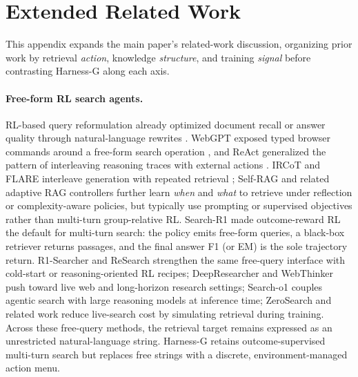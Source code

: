 \documentclass[letterpaper]{article} %
\begin{document}
\section{Extended Related Work}
\label{app:related}

This appendix expands the main paper's related-work discussion, organizing prior work by retrieval \emph{action}, knowledge \emph{structure}, and training \emph{signal} before contrasting Harness-G along each axis.

\paragraph{Free-form RL search agents.}
RL-based query reformulation already optimized document recall or answer quality through natural-language rewrites \citep{nogueira2017query,buck2018activeqa}.
WebGPT exposed typed browser commands around a free-form search operation \citep{nakano2021webgpt}, and ReAct generalized the pattern of interleaving reasoning traces with external actions \citep{yao2023react}.
IRCoT and FLARE interleave generation with repeated retrieval \citep{trivedi2023ircot,jiang2023flare}; Self-RAG \citep{asai2024selfrag} and related adaptive RAG controllers further learn \emph{when} and \emph{what} to retrieve under reflection or complexity-aware policies, but typically use prompting or supervised objectives rather than multi-turn group-relative RL.
Search-R1 \citep{jin2025searchr1} made outcome-reward RL the default for multi-turn search: the policy emits free-form queries, a black-box retriever returns passages, and the final answer F1 (or EM) is the sole trajectory return.
R1-Searcher \citep{song2025r1searcher} and ReSearch \citep{chen2025research} strengthen the same free-query interface with cold-start or reasoning-oriented RL recipes; DeepResearcher \citep{zheng2025deepresearcher} and WebThinker \citep{li2025webthinker} push toward live web and long-horizon research settings; Search-o1 \citep{li2025searcho1} couples agentic search with large reasoning models at inference time; ZeroSearch \citep{sun2025zerosearch} and related work reduce live-search cost by simulating retrieval during training.
Across these free-query methods, the retrieval target remains expressed as an unrestricted natural-language string.
Harness-G retains outcome-supervised multi-turn search but replaces free strings with a discrete, environment-managed action menu.
\end{document}

